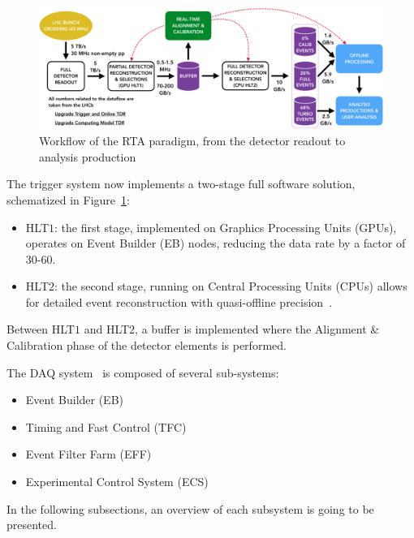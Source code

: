 \begin{figure}
    \centering
    \includegraphics[width=\textwidth]{figures/hidef_RTA_dataflow_widescreen.png}
    \caption{Workflow of the RTA paradigm, from the detector readout to analysis production}
    \label{fig:RTA}
\end{figure}

The trigger system now implements a two-stage full software solution, schematized in Figure~\ref{fig:RTA}:
\begin{itemize}
\item HLT$1$: the first stage, implemented on Graphics Processing Units (GPUs), operates on Event Builder (EB) nodes, reducing the data rate by a factor of 30-60.
\item HLT$2$: the second stage, running on Central Processing Units (CPUs) allows for detailed event reconstruction with quasi-offline precision~\cite{Gazzoni:2670650}.
\end{itemize}
Between HLT$1$ and HLT$2$, a buffer is implemented where the Alignment \& Calibration phase of the detector elements is performed.

The DAQ system~\cite{CERN-LHCC-2014-016} is composed of several sub-systems:
\begin{itemize}
\item Event Builder (EB)
\item Timing and Fast Control (TFC)
\item Event Filter Farm (EFF)
\item Experimental Control System (ECS)
\end{itemize}
In the following subsections, an overview of each subsystem is going to be presented. 

